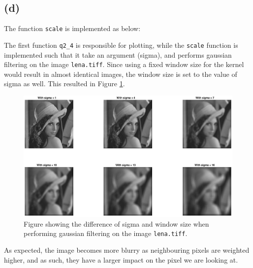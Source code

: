 \documentclass[a4paper]{article}
\begin{document}
\subsection{(d)}
The function \texttt{scale} is implemented as below:

The first function \texttt{q2\_4} is responsible for plotting, while the \texttt{scale} function is implemented such that it take an argument (sigma), and performs gaussian filtering on the image \texttt{lena.tiff}. Since using a fixed window size for the kernel would result in almost identical images, the window size is set to the value of sigma as well. This resulted in Figure \ref{fig4}.
\begin{figure}[H]
  \centering
  \captionsetup{justification=centering}
  \includegraphics[width=\textwidth]{fig4.eps}
  \caption{Figure showing the difference of sigma and window size when performing gaussian filtering on the image \texttt{lena.tiff}.}
  \label{fig4}
\end{figure}
As expected, the image becomes more blurry as neighbouring pixels are weighted higher, and as such, they have a larger impact on the pixel we are looking at.
\end{document}

